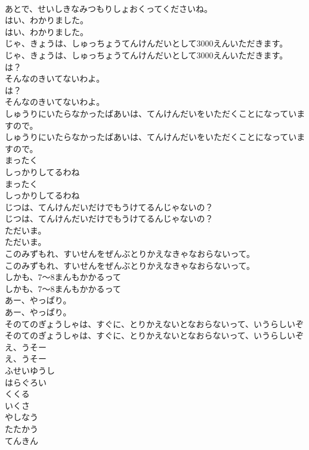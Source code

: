 \documentclass[8pt]{extreport}
\begin{document}
\begin{CJK}{UTF8}{min}
\\	あとで、せいしきなみつもりしょおくってくださいね。
\\	はい、わかりました。
\\	はい、わかりました。
\\	じゃ、きょうは、しゅっちょうてんけんだいとして3000えんいただきます。
\\	じゃ、きょうは、しゅっちょうてんけんだいとして3000えんいただきます。
\\	は？
\\	そんなのきいてないわよ。
\\	は？
\\	そんなのきいてないわよ。
\\	しゅうりにいたらなかったばあいは、てんけんだいをいただくことになっていますので。
\\	しゅうりにいたらなかったばあいは、てんけんだいをいただくことになっていますので。
\\	まったく
\\	しっかりしてるわね
\\	まったく
\\	しっかりしてるわね
\\	じつは、てんけんだいだけでもうけてるんじゃないの？
\\	じつは、てんけんだいだけでもうけてるんじゃないの？
\\	ただいま。
\\	ただいま。
\\	このみずもれ、すいせんをぜんぶとりかえなきゃなおらないって。
\\	このみずもれ、すいせんをぜんぶとりかえなきゃなおらないって。
\\	しかも、7～8まんもかかるって
\\	しかも、7～8まんもかかるって
\\	あー、やっぱり。
\\	あー、やっぱり。
\\	そのてのぎょうしゃは、すぐに、とりかえないとなおらないって、いうらしいぞ
\\	そのてのぎょうしゃは、すぐに、とりかえないとなおらないって、いうらしいぞ
\\	え、うそー
\\	え、うそー
\\	ふせいゆうし
\\	はらぐろい
\\	くくる
\\	いくさ
\\	やしなう
\\	たたかう
\\	てんきん

\end{CJK}
\end{document}
